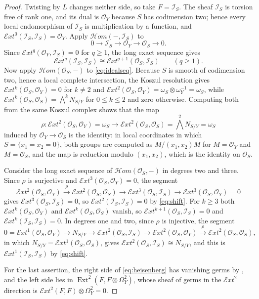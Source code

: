 \documentclass[11pt,reqno]{amsart}
\theoremstyle{plain}
\theoremstyle{definition}
\theoremstyle{remark}
\newcommand{\cE}{\mathcal{E}}
\newcommand{\cO}{\mathcal{O}}
\newcommand{\cH}{\mathcal{H}}
\newcommand{\cI}{\mathcal{I}}
\DeclareMathOperator{\Ext}{Ext}
\begin{document}
\begin{proof}
Twisting by $L$ changes neither side, so take $F=\cI_{S}$. The sheaf
$\cI_{S}$ is torsion free of rank one, and its dual is $\cO_{Y}$ because $S$
has codimension two; hence every local endomorphism of $\cI_{S}$ is
multiplication by a function, and
$\cE xt^{0}(\cI_{S},\cI_{S})=\cO_{Y}$. Apply $\cH om(-,\cI_{S})$ to
\begin{equation}\label{eq:idealseq}
  0\to\cI_{S}\to\cO_{Y}\to\cO_{S}\to0 .
\end{equation}
Since $\cE xt^{q}(\cO_{Y},\cI_{S})=0$ for $q\ge1$, the long exact sequence
gives
\begin{equation}\label{eq:shift}
  \cE xt^{q}(\cI_{S},\cI_{S})\cong\cE xt^{q+1}(\cO_{S},\cI_{S})
  \qquad(q\ge1).
\end{equation}
Now apply $\cH om(\cO_{S},-)$ to \eqref{eq:idealseq}. Because $S$ is smooth of
codimension two, hence a local complete intersection, the Koszul resolution
gives $\cE xt^{k}(\cO_{S},\cO_{Y})=0$ for $k\ne2$ and
$\cE xt^{2}(\cO_{S},\cO_{Y})=\omega_{S}\otimes\omega_{Y}^{-1}=\omega_{S}$,
while $\cE xt^{k}(\cO_{S},\cO_{S})=\bigwedge^{k}N_{S/Y}$ for $0\le k\le2$ and
zero otherwise. Computing both from the same Koszul complex shows that the
map
\[
  \rho\colon\cE xt^{2}(\cO_{S},\cO_{Y})=\omega_{S}
  \longrightarrow
  \cE xt^{2}(\cO_{S},\cO_{S})=\textstyle\bigwedge^{2}N_{S/Y}=\omega_{S}
\]
induced by $\cO_{Y}\to\cO_{S}$ is the identity: in local coordinates in which
$S=\{x_{1}=x_{2}=0\}$, both groups are computed as $M/(x_{1},x_{2})M$ for
$M=\cO_{Y}$ and $M=\cO_{S}$, and the map is reduction modulo $(x_{1},x_{2})$,
which is the identity on $\cO_{S}$.

Consider the long exact sequence of $\cH om(\cO_{S},-)$ in degrees two and
three. Since $\rho$ is surjective and $\cE xt^{3}(\cO_{S},\cO_{Y})=0$, the
segment
\[
  \cE xt^{2}(\cO_{S},\cO_{Y})\xrightarrow{\ \rho\ }
  \cE xt^{2}(\cO_{S},\cO_{S})\to
  \cE xt^{3}(\cO_{S},\cI_{S})\to
  \cE xt^{3}(\cO_{S},\cO_{Y})=0
\]
gives $\cE xt^{3}(\cO_{S},\cI_{S})=0$, so $\cE xt^{2}(\cI_{S},\cI_{S})=0$ by
\eqref{eq:shift}. For $k\ge3$ both $\cE xt^{k}(\cO_{S},\cO_{Y})$ and
$\cE xt^{k}(\cO_{S},\cO_{S})$ vanish, so
$\cE xt^{k+1}(\cO_{S},\cI_{S})=0$ and $\cE xt^{k}(\cI_{S},\cI_{S})=0$. In
degrees one and two, since $\rho$ is injective, the segment
\[
  0=\cE xt^{1}(\cO_{S},\cO_{Y})\to
  N_{S/Y}\to
  \cE xt^{2}(\cO_{S},\cI_{S})\to
  \cE xt^{2}(\cO_{S},\cO_{Y})\xrightarrow{\ \rho\ }
  \cE xt^{2}(\cO_{S},\cO_{S}),
\]
in which $N_{S/Y}=\cE xt^{1}(\cO_{S},\cO_{S})$, gives
$\cE xt^{2}(\cO_{S},\cI_{S})\cong N_{S/Y}$, and this is
$\cE xt^{1}(\cI_{S},\cI_{S})$ by \eqref{eq:shift}.

For the last assertion, the right side of \eqref{eq:heisenberg} has vanishing
germs by , and the left side lies in
$\Ext^{2}(F,F\otimes\Omega^{2}_{Y})$, whose sheaf of germs in the
$\cE xt^{2}$ direction is $\cE xt^{2}(F,F)\otimes\Omega^{2}_{Y}=0$.
\end{proof}
\end{document}
